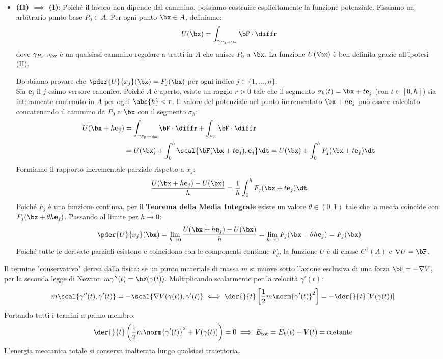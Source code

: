 \begin{dimostrazione}
\begin{itemize}
    \item \textbf{(II) $\implies$ (I)}: Poiché il lavoro non dipende dal cammino, possiamo costruire esplicitamente la funzione potenziale. Fissiamo un arbitrario punto base $P_0 \in A$. Per ogni punto $\bx \in A$, definiamo:
    \[
    U(\bx) = \int_{\gamma_{P_0 \to \bx}} \bF \cdot \diff\mathbf{r}
    \]
    dove $\gamma_{P_0 \to \bx}$ è un qualsiasi cammino regolare a tratti in $A$ che unisce $P_0$ a $\bx$. La funzione $U(\bx)$ è ben definita grazie all'ipotesi (II).

    Dobbiamo provare che $\pder{U}{x_j}(\bx) = F_j(\bx)$ per ogni indice $j \in \{1, \dots, n\}$.\\
    Sia $\mathbf{e}_j$ il $j$-esimo versore canonico. Poiché $A$ è aperto, esiste un raggio $r > 0$ tale che il segmento $\sigma_h(t) = \bx + t \mathbf{e}_j$ (con $t \in [0, h]$) sia interamente contenuto in $A$ per ogni $\abs{h} < r$.
    Il valore del potenziale nel punto incrementato $\bx + h\mathbf{e}_j$ può essere calcolato concatenando il cammino da $P_0$ a $\bx$ con il segmento $\sigma_h$:
    \begin{align*}
    U(\bx + h\mathbf{e}_j) &= \int_{\gamma_{P_0 \to \bx}} \bF \cdot \diff\mathbf{r} + \int_{\sigma_h} \bF \cdot \diff\mathbf{r} \\
    &= U(\bx) + \int_{0}^{h} \scal{\bF(\bx + t\mathbf{e}_j), \mathbf{e}_j} \dt = U(\bx) + \int_{0}^{h} F_j(\bx + t\mathbf{e}_j) \dt
    \end{align*}
    Formiamo il rapporto incrementale parziale rispetto a $x_j$:
    \[
    \frac{U(\bx + h\mathbf{e}_j) - U(\bx)}{h} = \frac{1}{h} \int_{0}^{h} F_j(\bx + t\mathbf{e}_j) \dt
    \]
    Poiché $F_j$ è una funzione continua, per il \textbf{Teorema della Media Integrale} esiste un valore $\theta \in (0, 1)$ tale che la media coincide con $F_j(\bx + \theta h \mathbf{e}_j)$. Passando al limite per $h \to 0$:
    \[
    \pder{U}{x_j}(\bx) = \lim_{h \to 0} \frac{U(\bx + h\mathbf{e}_j) - U(\bx)}{h} = \lim_{h \to 0} F_j(\bx + \theta h \mathbf{e}_j) = F_j(\bx)
    \]
    Poiché tutte le derivate parziali esistono e coincidono con le componenti continue $F_j$, la funzione $U$ è di classe $C^1(A)$ e $\nabla U = \bF$.
\end{itemize}
\end{dimostrazione}

\begin{osservazione}
Il termine "conservativo" deriva dalla fisica: se un punto materiale di massa $m$ si muove sotto l'azione esclusiva di una forza $\bF = -\nabla V$, per la seconda legge di Newton $m \gamma''(t) = \bF(\gamma(t))$. Moltiplicando scalarmente per la velocità $\gamma'(t)$:
\[
m \scal{\gamma''(t), \gamma'(t)} = -\scal{\nabla V(\gamma(t)), \gamma'(t)} \iff \der{}{t}\left[ \frac{1}{2} m \norm{\gamma'(t)}^2 \right] = -\der{}{t}\left[ V(\gamma(t)) \right]
\]
Portando tutti i termini a primo membro:
\[
\der{}{t}\left( \frac{1}{2} m \norm{\gamma'(t)}^2 + V(\gamma(t)) \right) = 0 \implies E_{\text{tot}} = E_k(t) + V(t) = \text{costante}
\]
L'energia meccanica totale si conserva inalterata lungo qualsiasi traiettoria.
\end{osservazione}

